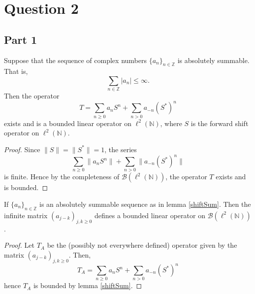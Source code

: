 \documentclass{unswmaths}
\begin{document}
\section*{Question 2}
\subsection*{Part 1}
\begin{lemma}
\label{shiftSum}
    Suppose that the sequence of complex numbers $\{a_n\}_{n\in\mathbb{Z}}$ is absolutely summable. That is,
    \begin{equation*}
        \sum_{n\in \mathbb{Z}} |a_n| \leq \infty.
    \end{equation*}
    Then the operator
    \begin{equation*}
        T = \sum_{n\geq0} a_n S^n + \sum_{n> 0} a_{-n} (S^*)^n
    \end{equation*}
    exists and is a bounded linear operator
    on $\ell^2(\mathbb{N})$, where $S$ is the forward shift operator on $\ell^2(\mathbb{N})$.
\end{lemma}
\begin{proof}
    Since $\|S\| = \| S^*\| = 1$, the series
    \begin{equation*}
        \sum_{n\geq0} \|a_n S^n\| + \sum_{n> 0} \|a_{-n} (S^*)^n\|
    \end{equation*}
    is finite. Hence by the completeness of $\mathcal{B}(\ell^2(\mathbb{N}))$, the operator
    $T$ exists and is bounded.
\end{proof}
\begin{proposition}
    If $\{a_n\}_{n\in \mathbb{Z}}$ is an absolutely summable sequence as in lemma
    \ref{shiftSum}. Then the infinite matrix $(a_{j-k})_{j,k\geq 0}$ defines
    a bounded linear operator on $\mathcal{B}(\ell^2(\mathbb{N}))$.
\end{proposition}
\begin{proof}
    Let $T_A$ be the (possibly not everywhere defined) operator given by the matrix
    $(a_{j-k})_{j,k\geq 0}$. Then, 
    \begin{equation*}
        T_A = \sum_{n\geq0} a_n S^n + \sum_{n> 0} a_{-n} (S^*)^n
    \end{equation*}
    hence $T_A$ is bounded by lemma \ref{shiftSum}.
\end{proof}
\end{document}

